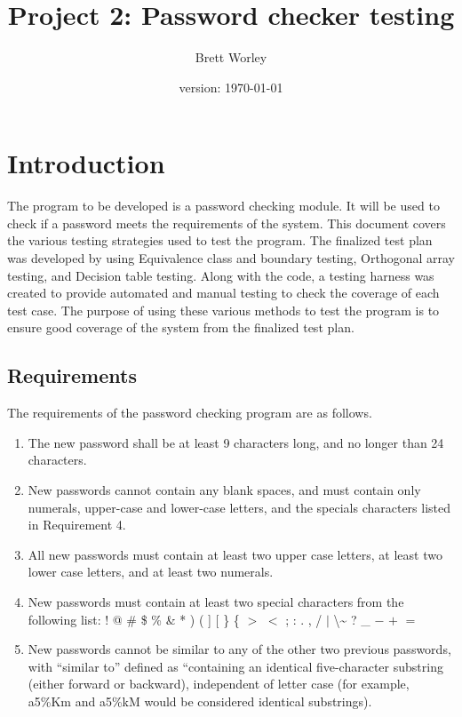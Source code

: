 \documentclass[12pt,letterpaper]{article}
\author{Brett Worley}
\title{Project 2: Password checker testing}
\date{version: \today}
\begin{document}
\maketitle
\tableofcontents



\section{Introduction}

The program to be developed is a password checking module. It will be used to check if a password
meets the requirements of the system. This document covers the various testing strategies
used to test the program. The finalized test plan was developed by using Equivalence class
and boundary testing, Orthogonal array testing, and Decision table testing. Along
with the code, a testing harness was created to provide automated and manual testing to check
the coverage of each test case. The purpose of using these various methods to test the program
is to ensure good coverage of the system from the finalized test plan.

\subsection{Requirements}

The requirements of the password checking program are as follows.

\begin{enumerate}

\item The new password shall be at least 9 characters long, and no longer than
24 characters.
\item New passwords cannot contain any blank spaces, and must contain only numerals, upper-case and lower-case letters, and
the specials characters listed in Requirement 4.
\item All new passwords must contain at least two upper case letters, at least two lower case
letters, and at least two numerals.
\item New passwords must contain at least two special characters from the following list: 
  !  @  \#  \$  \%  \&  *  )  (  ]  [  \}  \{  $>$  $<$  ; 
   :  .  ,  /  $|$   \textbackslash  \~{}  ?  \_  $-$  $+$  $=$ 

\item New passwords cannot be similar to any of the other two previous passwords, with ``similar to'' defined
as ``containing an identical five-character substring (either forward or backward), independent of letter
case (for example, a5\%Km and a5\%kM would be considered identical substrings).

\end{enumerate}
\end{document}
